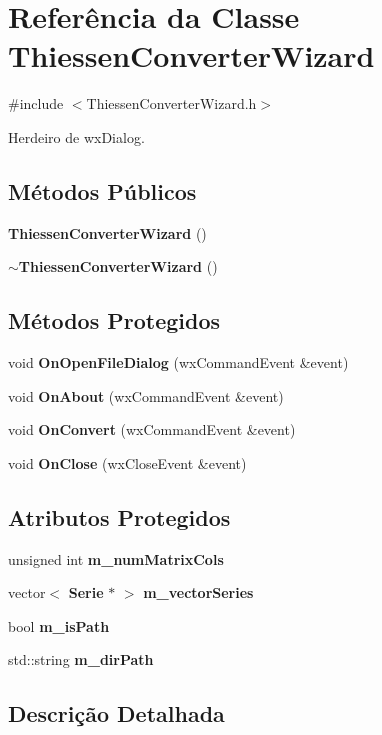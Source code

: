\section{Referência da Classe Thiessen\+Converter\+Wizard}
\label{class_thiessen_converter_wizard}


{\ttfamily \#include $<$Thiessen\+Converter\+Wizard.\+h$>$}



Herdeiro de wx\+Dialog.

\subsection*{Métodos Públicos}
\begin{DoxyCompactItemize}
\item 
{\bf Thiessen\+Converter\+Wizard} ()
\item 
{\bf $\sim$\+Thiessen\+Converter\+Wizard} ()
\end{DoxyCompactItemize}
\subsection*{Métodos Protegidos}
\begin{DoxyCompactItemize}
\item 
void {\bf On\+Open\+File\+Dialog} (wx\+Command\+Event \&event)
\item 
void {\bf On\+About} (wx\+Command\+Event \&event)
\item 
void {\bf On\+Convert} (wx\+Command\+Event \&event)
\item 
void {\bf On\+Close} (wx\+Close\+Event \&event)
\end{DoxyCompactItemize}
\subsection*{Atributos Protegidos}
\begin{DoxyCompactItemize}
\item 
unsigned int {\bf m\+\_\+num\+Matrix\+Cols}
\item 
vector$<$ {\bf Serie} $\ast$ $>$ {\bf m\+\_\+vector\+Series}
\item 
bool {\bf m\+\_\+is\+Path}
\item 
std\+::string {\bf m\+\_\+dir\+Path}
\end{DoxyCompactItemize}


\subsection{Descrição Detalhada}


